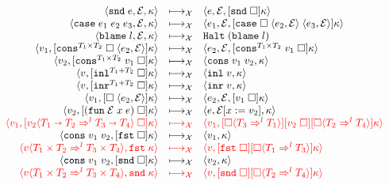 \documentclass[acmsmall,review,anonymous]{acmart}\settopmatter{printfolios=true,printccs=false,printacmref=false}
\newcommand{\plus}[0]{+}
\newcommand{\sOOinspect}[3]{\langle#1,#2,#3\rangle}
\newcommand{\sOOreturn}[2]{\langle#1,#2\rangle}
\newcommand{\sOOhalt}[1]{\mathtt{Halt} \; #1}
\newcommand{\POOfun}[2]{#1 \shortrightarrow #2}
\newcommand{\POOprod}[2]{#1 \times #2}
\newcommand{\POOsum}[2]{#1 \plus #2}
\newcommand{\eOOcdr}[1]{\mathtt{snd} \; #1}
\newcommand{\eOOcase}[3]{\mathtt{case} \; #1 \; #2 \; #3}
\newcommand{\eOOblame}[1]{\mathtt{blame} \; #1}
\newcommand{\cOOcast}[3]{#1 \Rightarrow^{#2} #3}
\newcommand{\oOOblame}[1]{\mathtt{blame} \; #1}
\newcommand{\vOOcast}[2]{#1\langle#2\rangle}
\newcommand{\vOOfun}[3]{\mathtt{fun} \; #1 \; #2 \; #3}
\newcommand{\vOOcons}[2]{\mathtt{cons}\;#1\;#2}
\newcommand{\vOOinl}[1]{\mathtt{inl}\;#1}
\newcommand{\vOOinr}[1]{\mathtt{inr}\;#1}
\newcommand{\kOOconsI}[5]{
	[\mathtt{cons}^{\POOprod{#1}{#2}} \; \square \; \langle#3,#4\rangle ]#5}
\newcommand{\kOOconsII}[4]{
	[\mathtt{cons}^{\POOprod{#1}{#2}} \; #3 \; \square]#4}
\newcommand{\kOOinl}[3]{[\mathtt{inl}^{\POOsum{#1}{#2}}\; \square]#3}
\newcommand{\kOOinr}[3]{[\mathtt{inr}^{\POOsum{#1}{#2}}\; \square]#3}
\newcommand{\kOOappI}[3]{
  [\square \; \langle#1,#2\rangle]#3
}
\newcommand{\kOOappII}[2]{
  [#1 \; \square]#2}
\newcommand{\kOOcar}[1]{[\mathtt{fst} \; \square]#1}
\newcommand{\kOOcdr}[1]{[\mathtt{snd} \; \square]#1}
\newcommand{\kOOcaseI}[4]{
  [\mathtt{case} \; \square \; \langle#1,#3\rangle \; \langle#2,#3\rangle ]#4}
\newcommand{\kOOcast}[2]{
  [\square \langle #1 \rangle]#2}
\newcommand{\redrule}[3]{#1 & \longmapsto_\mathcal{X} & #2 & #3\\}
\newcommand{\hiredrule}[3]{\highlight{#1} & \highlight{\longmapsto_\mathcal{X}} 
& \highlight{#2} & \highlight{#3} \\}
\newcommand{\highlight}[1]{{\color{red} #1}}
\begin{document}
\begin{figure}
\[\begin{array}{rclr}
\redrule{
  \sOOinspect{\eOOcdr{e}}{\mathcal{E}}{\kappa}}{
  \sOOinspect{e}{\mathcal{E}}{\kOOcdr{\kappa}}}{}

\redrule{
\sOOinspect{\eOOcase{e_1}{e_2}{e_3}}{\mathcal{E}}{\kappa}}{
\sOOinspect{e_1}{\mathcal{E}}{\kOOcaseI{e_2}{e_3}{\mathcal{E}}{\kappa}}}{}

\redrule{
\sOOinspect{\eOOblame{l}}{\mathcal{E}}{\kappa}}{
\sOOhalt{(\oOOblame{l})}}{}

\redrule{
\sOOreturn{v_1}{\kOOconsI{T_1}{T_2}{e_2}{\mathcal{E}}{\kappa}}}{
\sOOinspect{e_2}{\mathcal{E}}{\kOOconsII{T_1}{T_2}{v_1}{\kappa}}}{}

\redrule{
\sOOreturn{v_2}{\kOOconsII{T_1}{T_2}{v_1}{\kappa}}}{
\sOOreturn{\vOOcons{v_1}{v_2}}{\kappa}}{}

\redrule{
\sOOreturn{v}{\kOOinl{T_1}{T_2}{\kappa}}}{
\sOOreturn{\vOOinl{v}}{\kappa}}{}

\redrule{
\sOOreturn{v}{\kOOinr{T_1}{T_2}{\kappa}}}{
\sOOreturn{\vOOinr{v}}{\kappa}}{}

\redrule{
\sOOreturn{v_1}{\kOOappI{e_2}{\mathcal{E}}{\kappa}}}{
\sOOinspect{e_2}{\mathcal{E}}{\kOOappII{v_1}{\kappa}}}{}

\redrule{
\sOOreturn{v_2}{\kOOappII{(\vOOfun{\mathcal{E}}{x}{e})}{\kappa}}}{
\sOOinspect{e}{\mathcal{E}[x:=v_2]}{\kappa}}{}
  \hiredrule{
    \sOOreturn{v_1}{
      \kOOappII{\vOOcast{v_2}{
          \cOOcast{\POOfun{T_1}{T_2}}{l}{\POOfun{T_3}{T_4}}
      }}{\kappa}
    }
  }{
    \sOOreturn{v_1}{
      \kOOcast{\cOOcast{T_3}{l}{T_1}}{
        \kOOappII{v_2}{
          \kOOcast{\cOOcast{T_2}{l}{T_4}}{\kappa}
        }
      }
    }
  }{}
  \redrule{
  \sOOreturn{
    \vOOcons{v_1}{v_2}
  }{\kOOcar{\kappa}}
  }{
  \sOOreturn{v_1}{\kappa}
  }{}
  \hiredrule{
    \sOOreturn{
      \vOOcast{v}{\cOOcast{\POOprod{T_1}{T_2}}{l}{
          \POOprod{T_3}{T_4}}}
    }{\mathtt{fst} \; \kappa}
  }{
    \sOOreturn{v}{
      \kOOcar{
        \kOOcast{\cOOcast{T_1}{l}{T_3}}{\kappa}
      }}
  }{}
  \redrule{
  \sOOreturn{
  \vOOcons{v_1}{v_2}
  }{\kOOcdr{\kappa}}
  }{
  \sOOreturn{v_2}{\kappa}
  }{}
  
  \hiredrule{
    \sOOreturn{
      \vOOcast{v}{\cOOcast{\POOprod{T_1}{T_2}}{l}{
          \POOprod{T_3}{T_4}}}
    }{\mathtt{snd} \; \kappa}
  }{
    \sOOreturn{v}{
      \kOOcdr{\kOOcast{\cOOcast{T_2}{l}{T_4}}{\kappa}}}
  }{}


\end{array}\]
\end{figure}
\end{document}
